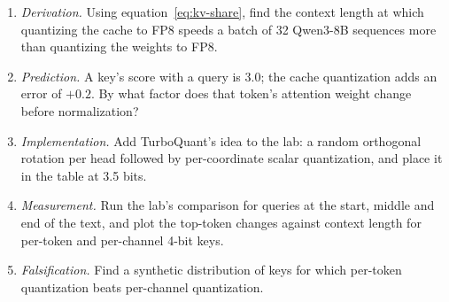 \begin{enumerate}
\item \emph{Derivation.} Using equation~\eqref{eq:kv-share}, find the context
length at which quantizing the cache to FP8 speeds a batch of 32 Qwen3-8B
sequences more than quantizing the weights to FP8.
\item \emph{Prediction.} A key's score with a query is $3.0$; the cache
quantization adds an error of $+0.2$. By what factor does that token's
attention weight change before normalization?
\item \emph{Implementation.} Add TurboQuant's idea to the lab: a random
orthogonal rotation per head followed by per-coordinate scalar quantization,
and place it in the table at 3.5 bits.
\item \emph{Measurement.} Run the lab's comparison for queries at the start,
middle and end of the text, and plot the top-token changes against context
length for per-token and per-channel 4-bit keys.
\item \emph{Falsification.} Find a synthetic distribution of keys for which
per-token quantization beats per-channel quantization.
\end{enumerate}


